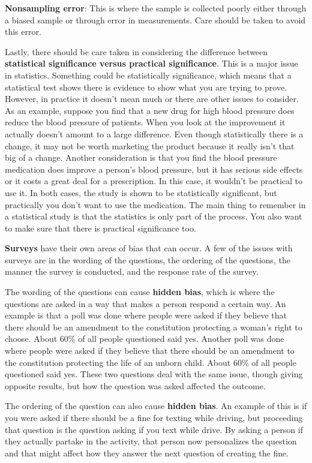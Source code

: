 \documentclass[]{book}
\begin{document}
\textbf{Nonsampling error}: This is where the sample is collected poorly
either through a biased sample or through error in measurements. Care
should be taken to avoid this error.

Lastly, there should be care taken in considering the difference between
\textbf{statistical significance versus practical significance}. This is a
major issue in statistics. Something could be statistically
significance, which means that a statistical test shows there is
evidence to show what you are trying to prove. However, in practice it
doesn't mean much or there are other issues to consider. As an example,
suppose you find that a new drug for high blood pressure does reduce the
blood pressure of patients. When you look at the improvement it actually
doesn't amount to a large difference. Even though statistically there is
a change, it may not be worth marketing the product because it really
isn't that big of a change. Another consideration is that you find the
blood pressure medication does improve a person's blood pressure, but it
has serious side effects or it costs a great deal for a prescription. In
this case, it wouldn't be practical to use it. In both cases, the study
is shown to be statistically significant, but practically you don't want
to use the medication. The main thing to remember in a statistical study
is that the statistics is only part of the process. You also want to
make sure that there is practical significance too.

\textbf{Surveys} have their own areas of bias that can occur. A few of the
issues with surveys are in the wording of the questions, the ordering of
the questions, the manner the survey is conducted, and the response rate
of the survey.

The wording of the questions can cause \textbf{hidden bias}, which is where
the questions are asked in a way that makes a person respond a certain
way. An example is that a poll was done where people were asked if they
believe that there should be an amendment to the constitution protecting
a woman's right to choose. About 60\% of all people questioned said yes.
Another poll was done where people were asked if they believe that there
should be an amendment to the constitution protecting the life of an
unborn child. About 60\% of all people questioned said yes. These two
questions deal with the same issue, though giving opposite results, but
how the question was asked affected the outcome.

The ordering of the question can also cause \textbf{hidden bias}. An example
of this is if you were asked if there should be a fine for texting while
driving, but proceeding that question is the question asking if you text
while drive. By asking a person if they actually partake in the
activity, that person now personalizes the question and that might
affect how they answer the next question of creating the fine.
\end{document}
